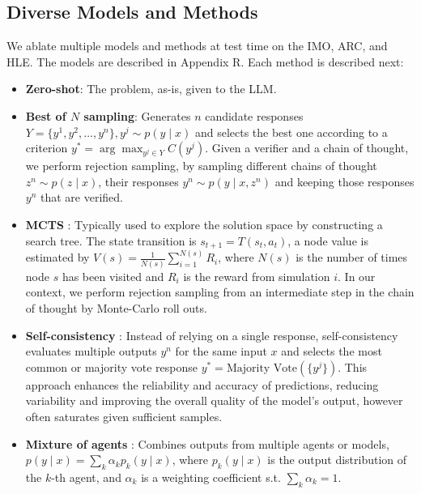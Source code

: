 \subsection{Diverse Models and Methods}

We ablate multiple models and methods \cite{optillm} at test time on the IMO, ARC, and HLE. The models are described in Appendix R. Each method is described next:

\begin{itemize}

\item {\bf Zero-shot}: The problem, as-is, given to the LLM.

\item {\bf Best of $N$ sampling}: Generates $n$ candidate responses $Y = \{ y^1, y^2, \dots, y^n \}, y^j \sim p(y \mid x)$ and selects the best one according to a criterion $y^* = \arg\max_{y^j \in Y} C(y^j)$. Given a verifier and a chain of thought, we perform rejection sampling, by sampling different chains of thought $z^{n} \sim p(z \mid x)$, their responses $y^{n} \sim p(y \mid x, z^{n})$ and keeping those responses $y^{n}$ that are verified.

\item {\bf MCTS} \cite{xie2024monte}: Typically used to explore the solution space by constructing a search tree. The state transition is $s_{t+1} = T(s_t, a_t)$, a node value is estimated by $V(s) = \frac{1}{N(s)} \sum_{i=1}^{N(s)} R_i$, where $N(s)$ is the number of times node $s$ has been visited and $R_i$ is the reward from simulation $i$. In our context, we perform rejection sampling from an intermediate step in the chain of thought by Monte-Carlo roll outs.

\item {\bf Self-consistency} \cite{wang2022self}: Instead of relying on a single response, self-consistency evaluates multiple outputs $y^{n}$ for the same input $x$ and selects the most common or majority vote response $y^* = \text{Majority Vote}(\{ y^j \})$. This approach enhances the reliability and accuracy of predictions, reducing variability and improving the overall quality of the model's output, however often saturates given sufficient samples.

\item {\bf Mixture of agents} \cite{wang2024mixture}: Combines outputs from multiple agents or models, $p(y \mid x) = \sum_{k} \alpha_k p_k(y \mid x)$, where $p_k(y \mid x)$ is the output distribution of the $k$-th agent, and $\alpha_k$ is a weighting coefficient s.t. $\sum_{k} \alpha_k = 1$.


\end{itemize}
